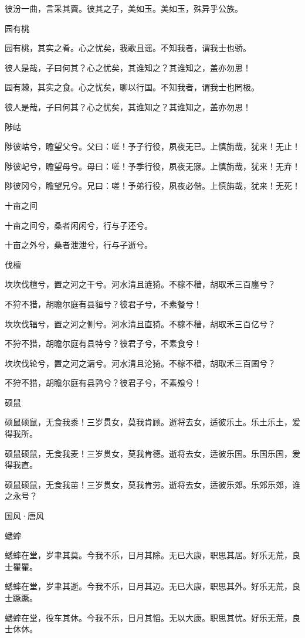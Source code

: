 彼汾一曲，言采其藚。彼其之子，美如玉。美如玉，殊异乎公族。

园有桃

园有桃，其实之肴。心之忧矣，我歌且谣。不知我者，谓我士也骄。

彼人是哉，子曰何其？心之忧矣，其谁知之？其谁知之，盖亦勿思！

园有棘，其实之食。心之忧矣，聊以行国。不知我者，谓我士也罔极。

彼人是哉，子曰何其？心之忧矣，其谁知之？其谁知之，盖亦勿思！

陟岵

陟彼岵兮，瞻望父兮。父曰：嗟！予子行役，夙夜无已。上慎旃哉，犹来！无止！

陟彼屺兮，瞻望母兮。母曰：嗟！予季行役，夙夜无寐。上慎旃哉，犹来！无弃！

陟彼冈兮，瞻望兄兮。兄曰：嗟！予弟行役，夙夜必偕。上慎旃哉，犹来！无死！

十亩之间

十亩之间兮，桑者闲闲兮，行与子还兮。

十亩之外兮，桑者泄泄兮，行与子逝兮。

伐檀

坎坎伐檀兮，置之河之干兮。河水清且涟猗。不稼不穑，胡取禾三百廛兮？

不狩不猎，胡瞻尔庭有县貆兮？彼君子兮，不素餐兮！

坎坎伐辐兮，置之河之侧兮。河水清且直猗。不稼不穑，胡取禾三百亿兮？

不狩不猎，胡瞻尔庭有县特兮？彼君子兮，不素食兮！

坎坎伐轮兮，置之河之漘兮。河水清且沦猗。不稼不穑，胡取禾三百囷兮？

不狩不猎，胡瞻尔庭有县鹑兮？彼君子兮，不素飧兮！

硕鼠

硕鼠硕鼠，无食我黍！三岁贯女，莫我肯顾。逝将去女，适彼乐土。乐土乐土，爰得我所。

硕鼠硕鼠，无食我麦！三岁贯女，莫我肯德。逝将去女，适彼乐国。乐国乐国，爰得我直。

硕鼠硕鼠，无食我苗！三岁贯女，莫我肯劳。逝将去女，适彼乐郊。乐郊乐郊，谁之永号？




国风·唐风


蟋蟀

蟋蟀在堂，岁聿其莫。今我不乐，日月其除。无已大康，职思其居。好乐无荒，良士瞿瞿。

蟋蟀在堂，岁聿其逝。今我不乐，日月其迈。无已大康，职思其外。好乐无荒，良士蹶蹶。

蟋蟀在堂，役车其休。今我不乐，日月其慆。无以大康。职思其忧。好乐无荒，良士休休。

